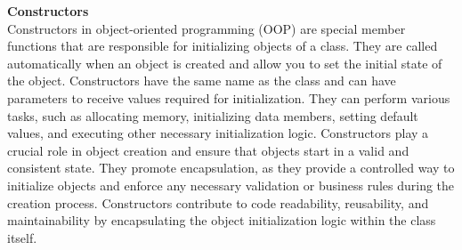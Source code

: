 \noindent \textbf{Constructors} \\

Constructors in object-oriented programming (OOP) are special member functions that are responsible for initializing objects of a class. They are called automatically when an object is created and allow you to set the initial 
state of the object. Constructors have the same name as the class and can have parameters to receive values required for initialization. They can perform various tasks, such as allocating memory, initializing data members, 
setting default values, and executing other necessary initialization logic. Constructors play a crucial role in object creation and ensure that objects start in a valid and consistent state. They promote encapsulation, as 
they provide a controlled way to initialize objects and enforce any necessary validation or business rules during the creation process. Constructors contribute to code readability, reusability, and maintainability by encapsulating 
the object initialization logic within the class itself. \\

